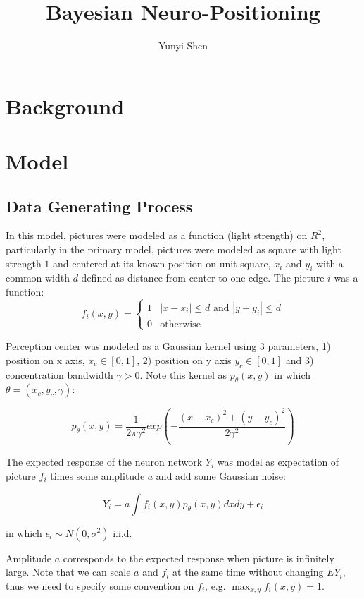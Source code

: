 \documentclass[]{article}
\title{Bayesian Neuro-Positioning}
\author{Yunyi Shen}
\begin{document}
\section{Background}

\section{Model}
\subsection{Data Generating Process}
In this model, pictures were modeled as a function (light strength) on $R^2$, particularly in the primary model, pictures were modeled as square with light strength $1$ and centered at its known position on unit square, $x_i$ and $y_i$ with a common width $d$ defined as distance from center to one edge. The picture $i$ was a function:
\begin{equation}
\label{picture}
	f_i(x,y)=\begin{cases}
	1 & |x-x_i|\le d \text{ and } |y-y_i|\le d\\
	0 & \text{otherwise}
	\end{cases}
\end{equation}


Perception center was modeled as a Gaussian kernel using 3 parameters, 1) position on x axis, $x_c\in [0,1]$, 2) position on y axis $y_c\in [0,1]$ and 3) concentration bandwidth $\gamma>0$. Note this kernel as $p_{\theta}(x,y)$ in which $\theta=(x_c,y_c,\gamma)$:

\begin{equation}
\label{neuro_center}
	p_{\theta}(x,y)=\frac{1}{2\pi \gamma^2}exp(-\frac{(x-x_c)^2+(y-y_c)^2}{2\gamma^2})
\end{equation}

The expected response of the neuron network $Y_i$ was model as expectation of picture $f_i$ times some amplitude $a$ and add some Gaussian noise:

\begin{equation}
	Y_i=a\int f_i(x,y) p_{\theta}(x,y)dxdy + \epsilon_i
\end{equation}

in which $\epsilon_i \sim N(0,\sigma^2)$ i.i.d.

Amplitude $a$ corresponds to the expected response when picture is infinitely large. Note that we can scale $a$ and $f_i$ at the same time without changing $EY_i$, thus we need to specify some convention on $f_i$, e.g. $\max_{x,y}f_i(x,y)=1$.
\end{document}
